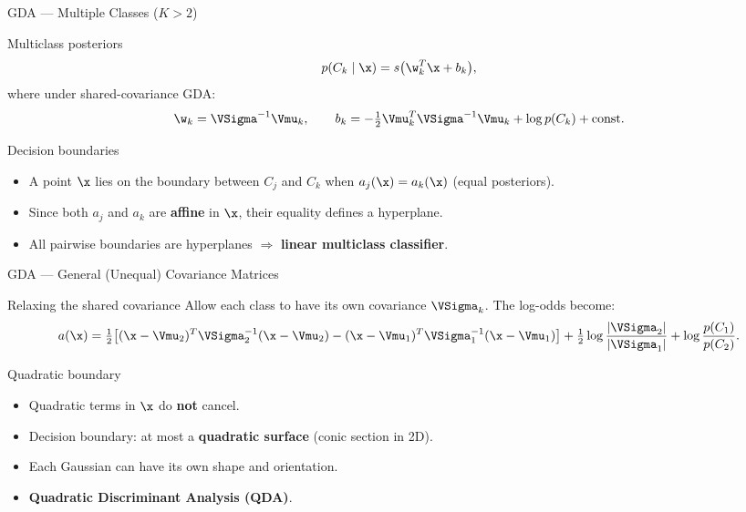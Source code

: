 \begin{frame}{GDA — Multiple Classes ($K>2$)}
  \begin{block}{Multiclass posteriors}
    \[
      p(C_k\mid\x)=s\bigl(\w_k^T\x+b_k\bigr),
    \]
    where under shared-covariance GDA:
    \[
      \w_k=\VSigma^{-1}\Vmu_k,\qquad
      b_k=-\tfrac{1}{2}\Vmu_k^T\VSigma^{-1}\Vmu_k+\log p(C_k)+\text{const.}
    \]
  \end{block}

  \begin{block}{Decision boundaries}
    \begin{itemize}
      \item A point $\x$ lies on the boundary between $C_j$ and $C_k$ when
            $a_j(\x)=a_k(\x)$ (equal posteriors).
      \item Since both $a_j$ and $a_k$ are \textbf{affine} in $\x$, their equality defines a hyperplane.
      \item All pairwise boundaries are hyperplanes $\Rightarrow$ \textbf{linear multiclass classifier}.
    \end{itemize}
  \end{block}
\end{frame}

\begin{frame}{GDA — General (Unequal) Covariance Matrices}
  \begin{block}{Relaxing the shared covariance}
    Allow each class to have its own covariance $\VSigma_k$.  The log-odds become:
    \[
      a(\x)=\tfrac{1}{2}\!\left[(\x-\Vmu_2)^T\VSigma_2^{-1}(\x-\Vmu_2)
            -(\x-\Vmu_1)^T\VSigma_1^{-1}(\x-\Vmu_1)\right]
            +\tfrac{1}{2}\log\frac{|\VSigma_2|}{|\VSigma_1|}
            +\log\frac{p(C_1)}{p(C_2)}.
    \]
  \end{block}

  \begin{block}{Quadratic boundary}
    \begin{itemize}
      \item Quadratic terms in $\x$ do \textbf{not} cancel.
      \item Decision boundary: at most a \textbf{quadratic surface} (conic section in 2D).
      \item Each Gaussian can have its own shape and orientation.
      \item \textbf{Quadratic Discriminant Analysis (QDA)}.
    \end{itemize}
  \end{block}
\end{frame}

